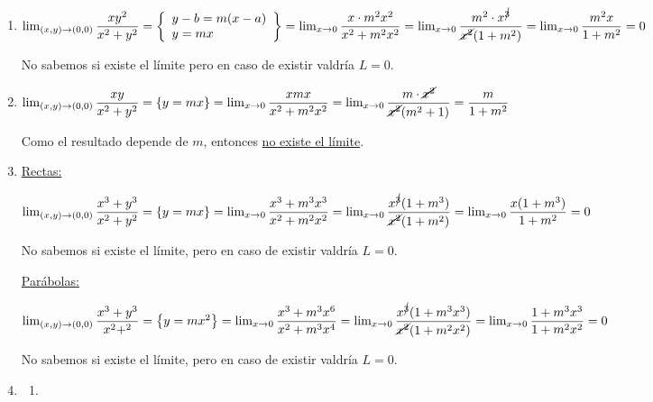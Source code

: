 \begin{enumerate}[label=\color{red}\textbf{\arabic*)}, leftmargin=*]
		\item {}
		
		$\lim_{(x,y)\to(0,0)}\dfrac{xy^2}{x^2+y^2}=\left\{\begin{array}{l}
		y-b=m(x-a)\\
		y=mx
		\end{array}\right\}=\lim_{x\to0}\dfrac{x\cdot m^2x^2}{x^2+m^2x^2}=\lim_{x\to0}\dfrac{m^2\cdot x^{\cancel{3}}}{\cancel{x^2}(1+m^2)}=\lim_{x\to0}\dfrac{m^2x}{1+m^2}=0$
		
		No sabemos si existe el límite pero en caso de existir valdría $L=0$.
		
		\item {}
		
		$\lim_{(x,y)\to(0,0)}\dfrac{xy}{x^2+y^2}=\left\{y=mx\right\}=\lim_{x\to0}\dfrac{xmx}{x^2+m^2x^2}=\lim_{x\to0}\dfrac{m\cdot\cancel{x^2}}{\cancel{x^2}(m^2+1)}=\dfrac{m}{1+m^2}$
		
		Como el resultado depende de $m$, entonces \underline{no existe el límite}.
		
		\item {}
		\underline{Rectas:}
		
		$\lim_{(x,y)\to(0,0)}\dfrac{x^3+y^3}{x^2+y^2}=\left\{y=mx\right\}=\lim_{x\to0}\dfrac{x^3+m^3x^3}{x^2+m^2x^2}=\lim_{x\to0}\dfrac{x^{\cancel{3}}(1+m^3)}{\cancel{x^2}(1+m^2)}=\lim_{x\to0}\dfrac{x(1+m^3)}{1+m^2}=0$
		
		No sabemos si existe el límite, pero en caso de existir valdría $L=0$.
		
		\underline{Parábolas:}
		
		$\lim_{(x,y)\to(0,0)}\dfrac{x^3+y^3}{x^2+^2}=\left\{y=mx^2\right\}=\lim_{x\to0}\dfrac{x^3+m^3x^6}{x^2+m^3x^4}=\lim_{x\to0}\dfrac{x^{\cancel{3}}(1+m^3x^3)}{\cancel{x^2}(1+m^2x^2)}=\lim_{x\to0}\dfrac{1+m^3x^3}{1+m^2x^2}=0$
		
		No sabemos si existe el límite, pero en caso de existir valdría $L=0$.
		\item {}
		\begin{enumerate}[label=\color{red}\alph*)]
			\item {}
			

\end{enumerate}
\end{enumerate}
